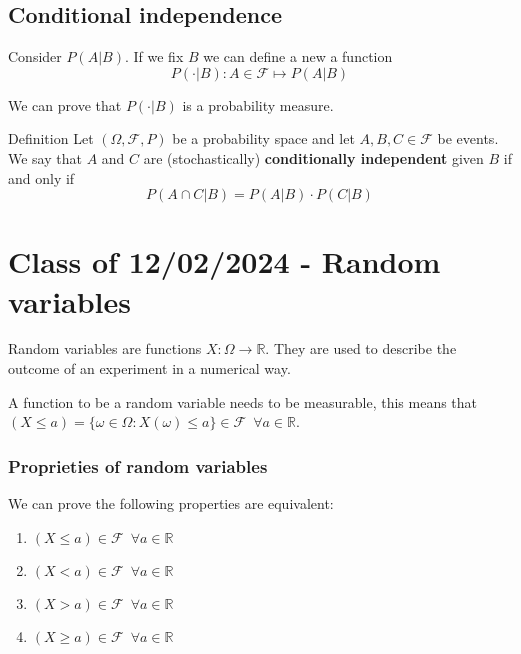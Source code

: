 \documentclass[10pt]{extarticle}
\newcommand{\R}{\mathbb{R}}
\newcommand{\F}{\mathcal{F}}
\begin{document}
\subsection{Conditional independence}

Consider $P(A|B)$. If we fix $B$ we can define a new a function
$$
    P(\cdot|B) : A \in \F \mapsto P(A|B)
$$

We can prove that $P(\cdot|B)$ is a probability measure.

\begin{bluebox}{Definition}
    Let $(\Omega, \F, P)$ be a probability space and let $A, B, C \in \F$ be events.
    We say that $A$ and $C$ are (stochastically) \textbf{conditionally independent} given $B$ if and only if
    $$
        P(A \cap C|B) = P(A|B) \cdot P(C|B)
    $$
\end{bluebox}

\section{Class of 12/02/2024 - Random variables}

Random variables are functions $X: \Omega \to \R$. They are used to describe the outcome of an experiment in a numerical way.

A function to be a random variable needs to be measurable, this means that $(X \leq a) = \{\omega \in \Omega: X(\omega) \leq a\} \in \F \enspace \forall a \in \R$.

\subsubsection{Proprieties of random variables}

We can prove the following properties are equivalent:
\begin{enumerate}
    \item $(X \leq a) \in \F \enspace \forall a \in \R$
    \item $(X < a) \in \F \enspace \forall a \in \R$
    \item $(X > a) \in \F \enspace \forall a \in \R$
    \item $(X \geq a) \in \F \enspace \forall a \in \R$
\end{enumerate}
\end{document}
